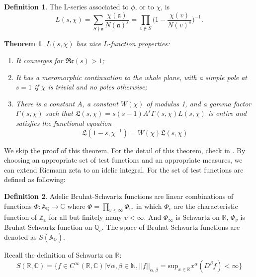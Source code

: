 \documentclass[12pt,a4paper,english]{article}
\theoremstyle{plain}
\newtheorem{thm}{Theorem}[section]
\theoremstyle{definition}
\newtheorem{defi}{Definition}
\begin{document}
\begin{defi}
The L-series associated to $\phi$, or to $\chi$, is 
\begin{equation*}
    L(s, \chi)=\sum_{S\nmid\mathfrak{a}}\frac{\chi(\mathfrak{a})}{N(\mathfrak{a})^{s}}=\prod_{v\not\in S}\bigg(1-\frac{\chi(v)}{N(v)^{s}}\bigg)^{-1}.
\end{equation*}
\end{defi}
\begin{thm}
$L(s,\chi)$ has nice $L$-function properties:
\begin{enumerate}
    \item It converges for $\mathfrak{Re}(s)>1$;
    \item It has a meromorphic continuation to the whole plane, with a simple pole at $s=1$ if $\chi$ is trivial and no poles otherwise;
    \item There is a constant $A$, a constant $W(\chi)$ of modulus 1, and a gamma factor $\Gamma(s,\chi)$ such that $\mathfrak{L}(s,\chi)=s(s-1)A^{s}\Gamma(s,\chi)L(s,\chi)$ is entire and satisfies the functional equation
    \begin{equation*}
        \mathfrak{L}(1-s,\chi^{-1})=W(\chi)\mathfrak{L}(s,\chi)
    \end{equation*}
\end{enumerate}
\end{thm}
We skip the proof of this theorem. For the detail of this theorem, check in \cite{gelbart2016automorphic}.
By choosing an appropriate set of test functions and an appropriate measures, we can extend Riemann zeta to an idelic integral.
For the set of test functions are defined as following:
\begin{defi}\label{BruhatSchwartz}
Adelic Bruhat-Schwartz functions are linear combinations of functions $\Phi: \mathbb{A}_{\mathbb{Q}}\rightarrow \mathbb{C}$ where $\Phi=\prod\limits_{v\leq\infty} \Phi_{v}$, in which $\Phi_{v}$ are the characteristic function of $\mathbb{Z}_{v}$ for all but finitely many $v< \infty$. And $\Phi_{\infty}$ is Schwartz on $\mathbb{R}$, $\Phi_{v}$ is Bruhat-Schwartz function on $\mathbb{Q}_{v}$. The space of Bruhat-Schwartz functions are denoted as $S(\mathbb{A_{\mathbb{Q}}})$.
\end{defi}
Recall the definition of Schwartz on $\mathbb{R}$:
\begin{equation*}
    S(\mathbb{R},\mathbb{C})=\{f\in C^{\infty}(\mathbb{R},\mathbb{C})|\forall \alpha,\beta\in \mathbb{N}, ||f||_{\alpha,\beta}=\text{sup}_{x\in\mathbb{R}}x^{\alpha}(D^{\beta}f)<\infty\}
\end{equation*}
\end{document}
